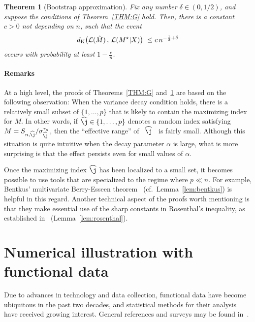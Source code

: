 \documentclass[aos,preprint]{imsart}
\numberwithin{equation}{section}
\theoremstyle{plain}
\newtheorem{theorem}{Theorem}[section]
\renewcommand{\hat}[1]{\widehat{#1}}
\renewcommand{\L}{\mathcal{L}}
\newcommand{\1}{{\bf{1}}}
\newcommand{\0}{\mathbf{0}}
\def\ci{\cite}
\begin{document}
\begin{theorem}[Bootstrap approximation]\label{THM:BOOT} Fix any number $\delta\in(0,1/2)$, and suppose the conditions of Theorem~\ref{THM:G} hold. Then, there is a constant $c>0$ not depending on $n$, such that the event
\begin{equation}
d_{\textup{K}}\big(\L( \tilde M)\, ,\, \L(M^{\star}|X)\big) \ \leq c\, n^{-\frac 12+\delta}
\end{equation}
occurs with probability at least $1-\frac cn$.
\end{theorem}

\paragraph{Remarks} At a high level, the proofs of Theorems~\ref{THM:G} and~\ref{THM:BOOT} are based on the following observation: When the variance decay condition holds, there is a relatively small subset of $\{1,\dots,p\}$ that is likely to contain the  maximizing index for $M$. In other words, if $\hat\j\in\{1,\dots,p\}$ denotes a random index satisfying $M=S_{n,\hat \j}/\sigma_{\hat \j}^{\tau_n}$, then the ``effective range'' of \, $\hat \j$ \, is fairly small. Although this situation is quite intuitive when the decay parameter $\alpha$ is large, what is more surprising is that the effect persists even for small values of $\alpha$. 

Once the maximizing index $\hat\j$ has been localized to a small set, it becomes possible to use tools that are specialized to the regime where $p\ll n$. For example, Bentkus' multivariate Berry-Esseen theorem~\citep{Bentkus:2003} (cf.~Lemma~\ref{lem:bentkus}) is helpful in this regard. Another technical aspect of the proofs worth mentioning is that they make essential use of the sharp constants in Rosenthal's inequality, as established in~\citep{Zinn:1985} (Lemma~\ref{lem:rosenthal}).


\section{Numerical illustration with functional data}\label{sec:expt}

Due to advances in technology and data collection, functional data have become ubiquitous
in the past two decades, and statistical methods for their analysis have received growing interest. General references and surveys may be found in~\ci{Ramsay2005,Ferraty2006,horv:12,Hsing2015,Wang2016}. 
%
\end{document}

